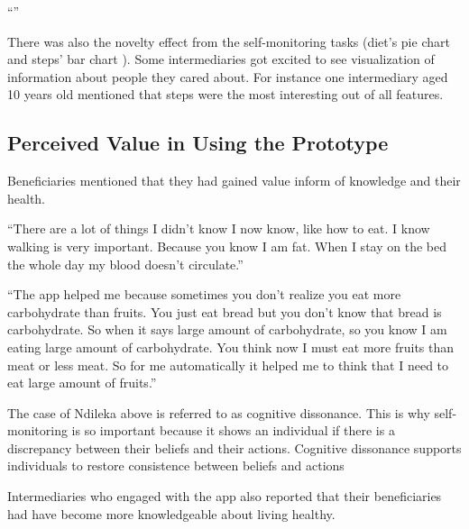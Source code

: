  {``''} 

There was also the novelty effect from the self-monitoring tasks (diet's pie chart and steps' bar chart ). Some intermediaries got excited to see visualization of information about people they cared about. For instance one intermediary aged 10 years old mentioned that steps were the most interesting out of all features. 

\subsection{Perceived Value in Using the Prototype}
Beneficiaries mentioned that they had gained value inform of knowledge and their health.

 {``There are a lot of things I didn't know I now know, like how to eat. I know walking is very important. Because you know I am fat. When I stay on the bed the whole day my blood doesn't circulate.''} 

 {``The app helped me because sometimes you don't realize you eat more carbohydrate than fruits. You just eat bread but you don't know that bread is carbohydrate. So when it says large amount of carbohydrate, so you know I am eating large amount of carbohydrate. You think now I must eat more fruits than meat or less meat. So for me automatically it helped me to think that I need to eat large amount of fruits.''}

The case of Ndileka above is referred to as cognitive dissonance. This is why self-monitoring is so important because it shows an individual if there is a discrepancy between their beliefs and their actions. Cognitive dissonance supports individuals to restore consistence between beliefs and actions\citep{Oinas-kukkonen:psd}

Intermediaries who engaged with the app also reported that their beneficiaries had have become more knowledgeable about living healthy. 
